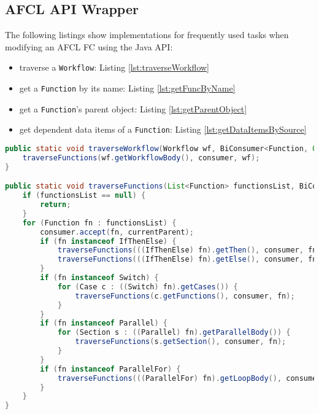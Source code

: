 \begin{appendix}


\chapter{AFCL API Wrapper}
\label{apx:afcl-wrapper-functions}

The following listings show implementations for frequently used tasks when modifying an AFCL FC using the Java API:
\linespread{1.2}
\begin{itemize}
    \setlength\itemsep{1pt}
    \item traverse a \texttt{Workflow}: Listing \ref{lst:traverseWorkflow}
    \item get a \texttt{Function} by its name: Listing \ref{lst:getFuncByName}
    \item get a \texttt{Function}'s parent object: Listing \ref{lst:getParentObject}
    \item get dependent data items of a \texttt{Function}: Listing \ref{lst:getDataItemsBySource}
\end{itemize}
\vspace{1.4cm}


\begin{lstlisting}[language=Java,caption={traverse functions of a workflow},label={lst:traverseWorkflow}]
public static void traverseWorkflow(Workflow wf, BiConsumer<Function, Object> consumer) {
    traverseFunctions(wf.getWorkflowBody(), consumer, wf);
}

public static void traverseFunctions(List<Function> functionsList, BiConsumer<Function, Object> consumer, Object currentParent) {
    if (functionsList == null) {
        return;
    }
    for (Function fn : functionsList) {
        consumer.accept(fn, currentParent);
        if (fn instanceof IfThenElse) {
            traverseFunctions(((IfThenElse) fn).getThen(), consumer, fn);
            traverseFunctions(((IfThenElse) fn).getElse(), consumer, fn);
        }
        if (fn instanceof Switch) {
            for (Case c : ((Switch) fn).getCases()) {
                traverseFunctions(c.getFunctions(), consumer, fn);
            }
        }
        if (fn instanceof Parallel) {
            for (Section s : ((Parallel) fn).getParallelBody()) {
                traverseFunctions(s.getSection(), consumer, fn);
            }
        }
        if (fn instanceof ParallelFor) {
            traverseFunctions(((ParallelFor) fn).getLoopBody(), consumer, fn);
        }
    }
}
\end{lstlisting}


\end{appendix}
